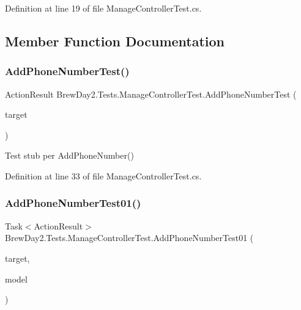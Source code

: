 Definition at line 19 of file Manage\+Controller\+Test.\+cs.



\subsection{Member Function Documentation}
\mbox{\label{class_brew_day2_1_1_tests_1_1_manage_controller_test_ab859ba5e64281aff297c87afa153d3c2}} 
\subsubsection{\texorpdfstring{Add\+Phone\+Number\+Test()}{AddPhoneNumberTest()}}
{\footnotesize\ttfamily Action\+Result Brew\+Day2.\+Tests.\+Manage\+Controller\+Test.\+Add\+Phone\+Number\+Test (\begin{DoxyParamCaption}\item[{\mbox{[}\+Pex\+Assume\+Under\+Test\mbox{]} \mbox{\hyperlink{class_brew_day2_1_1_controllers_1_1_manage_controller}{Manage\+Controller}}}]{target }\end{DoxyParamCaption})}



Test stub per Add\+Phone\+Number()



Definition at line 33 of file Manage\+Controller\+Test.\+cs.

\mbox{\label{class_brew_day2_1_1_tests_1_1_manage_controller_test_a4f3a011bf9dfb138527dfed68a27e92c}} 
\subsubsection{\texorpdfstring{Add\+Phone\+Number\+Test01()}{AddPhoneNumberTest01()}}
{\footnotesize\ttfamily Task$<$Action\+Result$>$ Brew\+Day2.\+Tests.\+Manage\+Controller\+Test.\+Add\+Phone\+Number\+Test01 (\begin{DoxyParamCaption}\item[{\mbox{[}\+Pex\+Assume\+Under\+Test\mbox{]} \mbox{\hyperlink{class_brew_day2_1_1_controllers_1_1_manage_controller}{Manage\+Controller}}}]{target,  }\item[{\mbox{\hyperlink{class_brew_day2_1_1_models_1_1_add_phone_number_view_model}{Add\+Phone\+Number\+View\+Model}}}]{model }\end{DoxyParamCaption})}



